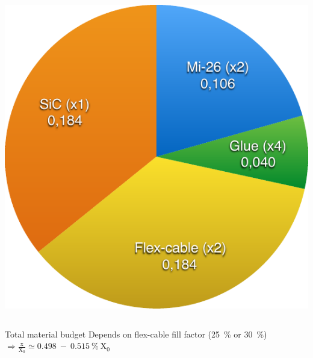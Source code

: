 \documentclass{beamer}
\begin{document}
\begin{frame}
\begin{columns}[c]
\begin{column}{5cm}
          \includegraphics[width = \textwidth]{Pictures/X02.pdf}
        \end{column}
      \end{columns}

      \begin{block}{Total material budget}
        \centering 
        Depends on flex-cable fill factor (25~\% or 30~\%)
        $\Rightarrow \frac{\text{x}}{\text{X}_0} \simeq 0.498~-~0.515~\%~\text{X}_0$
      \end{block}
    \end{frame}
\end{document}
